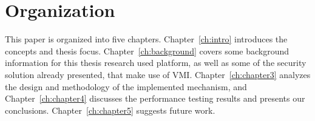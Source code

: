 \section{Organization}\label{sec:organization}
This paper is organized into five chapters. Chapter~\ref{ch:intro} introduces the concepts and thesis focus. Chapter~\ref{ch:background} covers some background information for this thesis research used platform, as well as some of the security solution already presented, that make use of VMI. Chapter~\ref{ch:chapter3} analyzes the design and methodology of the implemented mechanism, and Chapter~\ref{ch:chapter4} discusses the performance testing results and presents our conclusions. Chapter~\ref{ch:chapter5} suggests future work.



